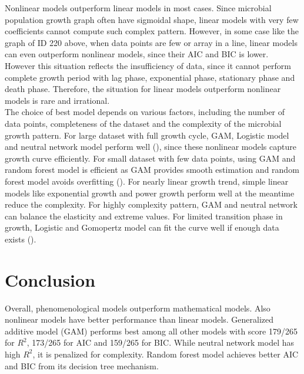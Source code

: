 \documentclass[11pt]{article}
\begin{document}
\noindent Nonlinear models outperform linear models in most cases. Since microbial population growth graph often have sigmoidal shape, linear models with very few coefficients cannot compute such complex pattern. However, in some case like the graph of ID 220 above, when data points are few or array in a line, linear models can even outperform nonlinear models, since their AIC and BIC is lower. However this situation reflects the insufficiency of data, since it cannot perform complete growth period with lag phase, exponential phase, stationary phase and death phase. Therefore, the situation for linear models outperform nonlinear models is rare and irrational. \\

\noindent The choice of best model depends on various factors, including the number of data points, completeness of the dataset and the complexity of the microbial growth pattern. For large dataset with full growth cycle, GAM, Logistic model and neutral network model perform well (\cite{wood2017gam}), since these nonlinear models capture growth curve efficiently. For small dataset with few data points, using GAM and random forest model is efficient as GAM provides smooth estimation and random forest model avoids overfitting (\cite{breiman2001rf}). For nearly linear growth trend, simple linear models like exponential growth and power growth perform well at the meantime reduce the complexity. For highly complexity pattern, GAM and neutral network can balance the elasticity and extreme values. For limited transition phase in growth, Logistic and Gomopertz model can fit the curve well if enough data exists (\cite{zwietering1990bacterial}).

\section{Conclusion}
Overall, phenomenological models outperform mathematical models. Also nonlinear models have better performance than linear models. Generalized additive model (GAM) performs best among all other models with score 179/265 for $R^2$, 173/265 for AIC and 159/265 for BIC. While neutral network model has high $R^2$, it is penalized for complexity. Random forest model achieves better AIC and BIC from its decision tree mechanism. 



\end{document}
